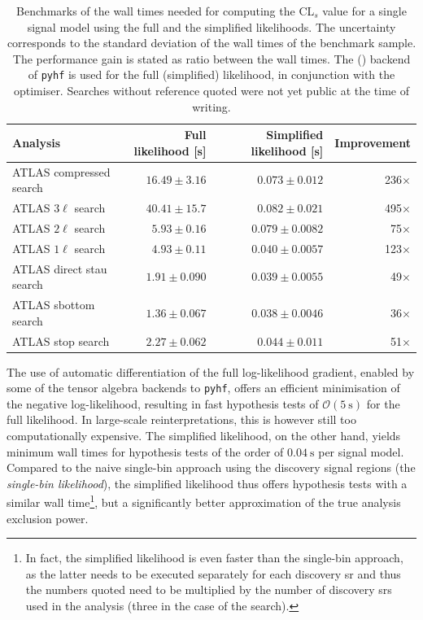 \begin{table}
	\begin{center}
	\small
			\begin{tabular} {l r r r}
				\toprule
				Analysis & Full likelihood [s] & Simplified likelihood [s] & Improvement \\
				\midrule
				ATLAS compressed search~\cite{SUSY-2018-16} & $16.49\pm 3.16$ & $0.073 \pm 0.012$ & 236$\times$ \\
				ATLAS $3\ell$ search & $40.41 \pm 15.7$ & $0.082 \pm 0.021$ & 495$\times$\\
				ATLAS $2\ell$ search~\cite{SUSY-2018-32} & $5.93 \pm 0.16$ & $0.079 \pm 0.0082$ & 75$\times$\\
				ATLAS $1\ell$ search~\cite{SUSY-2019-08} & $4.93 \pm 0.11$ & $0.040 \pm 0.0057$ & 123$\times$ \\
				ATLAS direct stau search~\cite{SUSY-2018-04} & $1.91 \pm 0.090$ & $0.039 \pm 0.0055$ & 49$\times$\\
				ATLAS sbottom search~\cite{SUSY-2018-31} & $1.36 \pm 0.067$ & $0.038 \pm 0.0046$ & 36$\times$ \\
				ATLAS stop search & $2.27 \pm 0.062$ & $0.044 \pm 0.011$ & 51$\times$\\
				\bottomrule
			\end{tabular}
		\caption{Benchmarks of the wall times needed for computing the CL$_s$ value for a single signal model using the full and the simplified likelihoods. 
		The uncertainty corresponds to the standard deviation of the wall times of the benchmark sample.
		The performance gain is stated as ratio between the wall times. The  () backend of \texttt{pyhf} is used for the full (simplified) likelihood, in conjunction with the  optimiser. Searches without reference quoted were not yet public at the time of writing.}
		\label{tab:simplified_performance}
	\end{center}
\end{table}

The use of automatic differentiation of the full log-likelihood gradient, enabled by some of the tensor algebra backends to \texttt{pyhf}, offers an efficient minimisation of the negative log-likelihood, resulting in fast hypothesis tests of $\mathcal{O}(\SI{5}{\second})$ for the full likelihood.
In large-scale reinterpretations, this is however still too computationally expensive.
The simplified likelihood, on the other hand, yields minimum wall times for hypothesis tests of the order of $\SI{0.04}{\second}$ per signal model.
Compared to the naive single-bin approach using the discovery signal regions (the \textit{single-bin likelihood}), the simplified likelihood thus offers hypothesis tests with a similar wall time\footnote{In fact, the simplified likelihood is even faster than the single-bin approach, as the latter needs to be executed separately for each discovery \gls{sr} and thus the numbers quoted need to be multiplied by the number of discovery \glspl{sr} used in the analysis (three in the case of the \onelepton search).}, but a significantly better approximation of the true analysis exclusion power.

